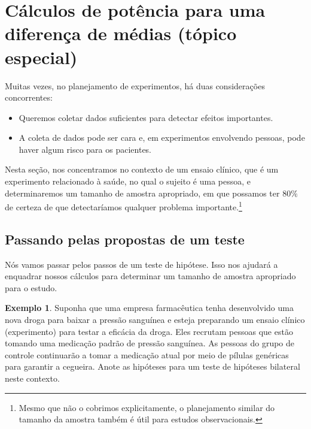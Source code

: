 \documentclass[
]{book}
\theoremstyle{definition}
\theoremstyle{definition}
\newtheorem{example}{Exemplo}[chapter]
\theoremstyle{definition}
\theoremstyle{definition}
\theoremstyle{remark}
\begin{document}
\hypertarget{powerCalculationsDifferenceMeans}{%
\section{Cálculos de potência para uma diferença de médias (tópico especial)}\label{powerCalculationsDifferenceMeans}}

Muitas vezes, no planejamento de experimentos, há duas considerações concorrentes:

\begin{itemize}
\item
  Queremos coletar dados suficientes para detectar efeitos importantes.
\item
  A coleta de dados pode ser cara e, em experimentos envolvendo pessoas, pode haver algum risco para os pacientes.
\end{itemize}

Nesta seção, nos concentramos no contexto de um ensaio clínico, que é um experimento relacionado à saúde, no qual o sujeito é uma pessoa, e determinaremos um tamanho de amostra apropriado, em que possamos ter \(80\%\) de certeza de que detectaríamos qualquer problema importante.\footnote{Mesmo que não o cobrimos explicitamente, o planejamento similar do tamanho da amostra também é útil para estudos observacionais.}

\hypertarget{passingTestProposal}{%
\subsection{Passando pelas propostas de um teste}\label{passingTestProposal}}

Nós vamos passar pelos passos de um teste de hipótese. Isso nos ajudará a enquadrar nossos cálculos para determinar um tamanho de amostra apropriado para o estudo.

\begin{example}
\protect\hypertarget{exm:unnamed-chunk-207}{}{\label{exm:unnamed-chunk-207} }Suponha que uma empresa farmacêutica tenha desenvolvido uma nova droga para baixar a pressão sanguínea e esteja preparando um ensaio clínico (experimento) para testar a eficácia da droga. Eles recrutam pessoas que estão tomando uma medicação padrão de pressão sanguínea. As pessoas do grupo de controle continuarão a tomar a medicação atual por meio de pílulas genéricas para garantir a cegueira. Anote as hipóteses para um teste de hipóteses bilateral neste contexto.
\end{example}
\end{document}
